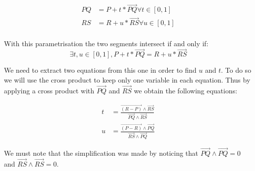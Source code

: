 \documentclass[12pt, a4paper]{memoir} %
\begin{document}
\begin{align}
	PQ &= P + t*\overrightarrow{PQ} \forall t \in [0,1]\\
	RS &= R + u*\overrightarrow{RS} \forall u \in [0,1]\\
\end{align}

With this parametrisation the two segments intersect if and only if:\\
\begin{equation}
\exists t,u \in [0,1], P + t*\overrightarrow{PQ} = R + u*\overrightarrow{RS}
\end{equation}


We need to extract two equations from this one in order to find $u$ and $t$.
To do so we will use the cross product to keep only one variable in each equation. Thus by applying a cross product with $\overrightarrow{PQ}$ and $\overrightarrow{RS}$ we obtain the following equations:

\begin{align}
	t &= \frac{\overrightarrow{(R - P)} \wedge \overrightarrow{RS}}{\overrightarrow{PQ} \wedge \overrightarrow{RS}}\\
	u &= \frac{\overrightarrow{(P - R)} \wedge \overrightarrow{PQ}}{\overrightarrow{RS} \wedge \overrightarrow{PQ}}
\end{align}

We must note that the simplification was made by noticing that $\overrightarrow{PQ} \wedge \overrightarrow{PQ} = 0$ and $\overrightarrow{RS} \wedge \overrightarrow{RS} = 0$.
\end{document}

